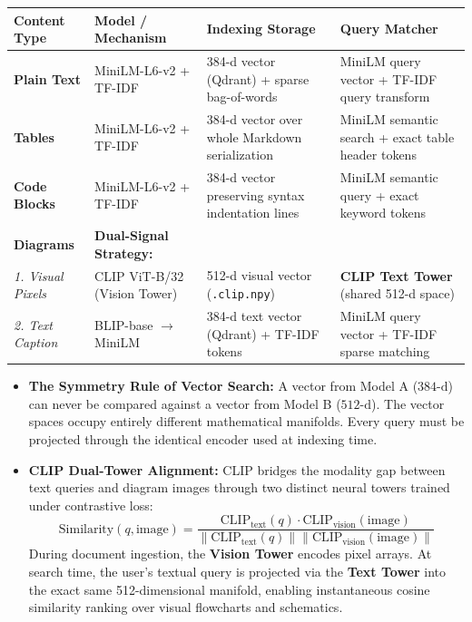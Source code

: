 \documentclass[11pt,a4paper]{article}
\begin{document}
{\footnotesize
\begin{center}
\begin{tabular}{@{}lp{3.6cm}p{4.0cm}p{4.0cm}@{}}
\toprule
Content Type & Model / Mechanism & Indexing Storage & Query Matcher \\
\midrule
\textbf{Plain Text} & MiniLM-L6-v2 + TF-IDF & 384-d vector (Qdrant) + sparse bag-of-words & MiniLM query vector + TF-IDF query transform \\
\textbf{Tables} & MiniLM-L6-v2 + TF-IDF & 384-d vector over whole Markdown serialization & MiniLM semantic search + exact table header tokens \\
\textbf{Code Blocks} & MiniLM-L6-v2 + TF-IDF & 384-d vector preserving syntax indentation lines & MiniLM semantic query + exact keyword tokens \\
\textbf{Diagrams} & \textbf{Dual-Signal Strategy:} & & \\
\quad \emph{1. Visual Pixels} & CLIP ViT-B/32 (Vision Tower) & 512-d visual vector (\texttt{.clip.npy}) & \textbf{CLIP Text Tower} (shared 512-d space) \\
\quad \emph{2. Text Caption} & BLIP-base $\rightarrow$ MiniLM & 384-d text vector (Qdrant) + TF-IDF tokens & MiniLM query vector + TF-IDF sparse matching \\
\bottomrule
\end{tabular}
\end{center}
}

\begin{itemize}[leftmargin=1.0cm]
\item \textbf{The Symmetry Rule of Vector Search:} A vector from Model A ($384\text{-d}$) can never be compared against a vector from Model B ($512\text{-d}$). The vector spaces occupy entirely different mathematical manifolds. Every query must be projected through the identical encoder used at indexing time.
\item \textbf{CLIP Dual-Tower Alignment:} CLIP bridges the modality gap between text queries and diagram images through two distinct neural towers trained under contrastive loss:
\begin{equation}
\text{Similarity}(q, \text{image}) = \frac{\text{CLIP}_{\text{text}}(q) \cdot \text{CLIP}_{\text{vision}}(\text{image})}{\|\text{CLIP}_{\text{text}}(q)\| \|\text{CLIP}_{\text{vision}}(\text{image})\|}
\end{equation}
During document ingestion, the \textbf{Vision Tower} encodes pixel arrays. At search time, the user's textual query is projected via the \textbf{Text Tower} into the exact same 512-dimensional manifold, enabling instantaneous cosine similarity ranking over visual flowcharts and schematics.
\end{itemize}
\end{document}
